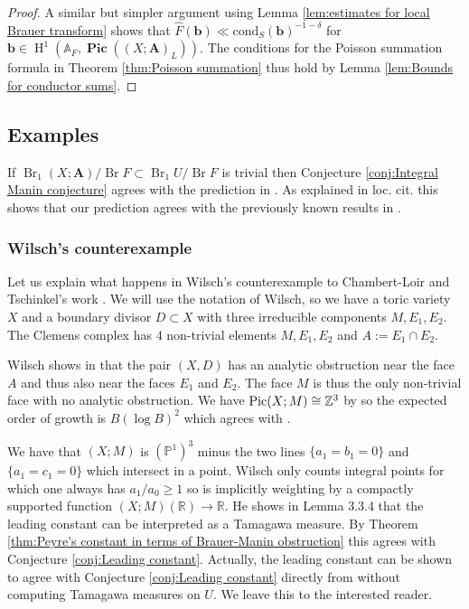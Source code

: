 \documentclass[a4paper,11pt,reqno]{amsart}
\newcommand{\R}{\mathbb{R}}
\newcommand{\A}{\mathbb{A}}
\newcommand{\Proj}{\mathbb{P}}
\DeclareMathOperator{\Pic}{Pic}
\DeclareMathOperator{\Br}{Br}
\DeclareMathOperator{\HH}{H}
\theoremstyle{definition}
\begin{document}
\begin{proof}
	A similar but simpler argument using Lemma \ref{lem:estimates for local Brauer transform} shows that $\hat{F}(\mathbf{b}) \ll \text{cond}_S(\mathbf{b})^{- 1 - \delta}$ for $\mathbf{b} \in \HH^1(\A_F, \bm{\Pic}((X ; \mathbf{A})_L)).$ The conditions for the Poisson summation formula in Theorem \ref{thm:Poisson summation} thus hold by Lemma \ref{lem:Bounds for conductor sums}.
\end{proof}

\subsection{Examples}
If $\Br_1(X ; \mathbf{A})/ \Br F \subset \Br_1 U /\Br F$ is trivial then Conjecture \ref{conj:Integral Manin conjecture} agrees with the prediction in \cite[\S2.5]{Wilsch2022Integral}. As explained in loc. cit. this shows that our prediction agrees with the previously known results in \cite{Chambert2012Integral, Takloo2013Integral, Chow2019Distribution, Wilsch2022Integral,Derenthal2022Integral, Wilsch2023Integral}.
\subsubsection{Wilsch's counterexample}
Let us explain what happens in Wilsch's counterexample \cite{Wilsch2022Integral} to Chambert-Loir and Tschinkel's work \cite{Chambert-Loir2010Integral}. We will use the notation of Wilsch, so we have a toric variety $X$ and a boundary divisor $D \subset X$ with three irreducible components $M, E_1, E_2$. The Clemens complex has $4$ non-trivial elements $M, E_1, E_2$ and $A := E_1 \cap E_2$. 

Wilsch shows in \cite[\S 3.3]{Wilsch2022Integral} that the pair $(X, D)$ has an analytic obstruction near the face $A$ and thus also near the faces $E_1$ and $E_2$. The face $M$ is thus the only non-trivial face with no analytic obstruction. We have $\Pic(X ; M) \cong \Z^3$ by \cite[Prop.~3.3.1]{Wilsch2022Integral} so the expected order of growth is $B (\log B)^2$ which agrees with \cite[Thm.~1.0.1]{Wilsch2022Integral}. 

We have that $(X ; M)$ is $(\Proj^1)^3$ minus the two lines $\{a_1 = b_1 = 0\}$ and $\{a_1 = c_1 = 0\}$ which intersect in a point. Wilsch only counts integral points for which one always has $a_1/a_0 \geq 1$ so is implicitly weighting by a compactly supported function $(X ; M)(\R) \to \R$. He shows in Lemma 3.3.4 that the leading constant can be interpreted as a Tamagawa measure. By Theorem \ref{thm:Peyre's constant in terms of Brauer-Manin obstruction} this agrees with Conjecture \ref{conj:Leading constant}. Actually, the leading constant can be shown to agree with Conjecture \ref{conj:Leading constant} directly from \cite[Lem.~3.2.1]{Wilsch2022Integral} without computing Tamagawa measures on $U$. We leave this to the interested reader.
\end{document}
